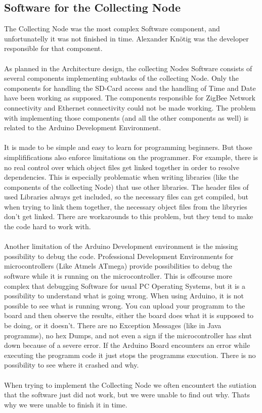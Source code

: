 \documentclass[
	11pt,
	a4paper
]{article}%
\begin{document}
\subsection{Software for the Collecting Node}

The Collecting Node was the most complex Software component, and unfortunatelly it was not finished in time. Alexander Knötig was the developer responsible for that component.
\\\\
As planned in the Architecture design, the collecting Nodes Software consists of several components implementing subtasks of the collecting Node. Only the components for handling the SD-Card access and the handling of Time and Date have been working as supposed. The components responsible for ZigBee Network connectivity and Ethernet connectivity could not be made working. The problem with implementing those components (and all the other components as well) is related to the Arduino Development Environment.
\\\\
It is made to be simple and easy to learn for programming beginners. But those simplififications also enforce limitations on the programmer. For example, there is no real control over which object files get linked together in order to resolve dependencies. This is especially problematic when writing libraries (like the components of the collecting Node) that use other libraries. The header files of used Libraries always get included, so the necessary files can get compiled, but when trying to link them together, the necessary object files from the libryries don't get linked. There are workarounds to this problem, but they tend to make the code hard to work with.
\\\\
Another limitation of the Arduino Development environment is the missing possibility to debug the code. Professional Development Environments for microcontrollers (Like Atmels ATmega) provide possibilities to debug the software while it is running on the microcontroller. This is offcourse more complex that debugging Software for usual PC Operating Systems, but it is a possibility to understand what is going wrong. When using Arduino, it is not possible to see what is running wrong. You can upload your programm to the board and then observe the results, either the board does what it is supposed to be doing, or it doesn't. There are no Exception Messages (like in Java programms), no hex Dumps, and not even a sign if the microcontroller has shut down because of a severe error. If the Arduino Board encounters an error while executing the programm code it just stops the programms execution. There is no possibility to see where it crashed and why.
\\\\
When trying to implement the Collecting Node we often encountert the sutiation that the software just did not work, but we were unable to find out why. Thats why we were unable to finish it in time.
\end{document}
